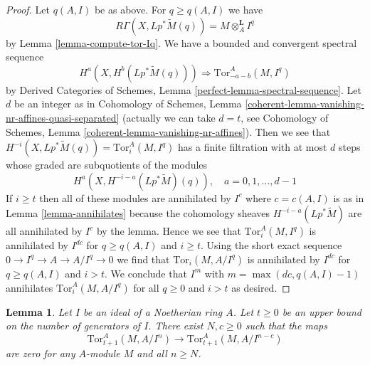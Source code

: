 \documentclass{stacks-project}
\theoremstyle{plain}
\newtheorem{lemma}[subsection]{Lemma}
\theoremstyle{definition}
\theoremstyle{remark}
\numberwithin{equation}{subsection}
\begin{document}
\begin{proof}
Let $q(A, I)$ be as above. For $q \geq q(A, I)$ we have
$$
R\Gamma(X, Lp^*\widetilde{M}(q)) = M \otimes_A^\mathbf{L} I^q
$$
by Lemma \ref{lemma-compute-tor-Iq}.
We have a bounded and convergent spectral sequence
$$
H^a(X, H^b(Lp^*\widetilde{M}(q))) \Rightarrow
\text{Tor}_{-a - b}^A(M, I^q)
$$
by Derived Categories of Schemes, Lemma \ref{perfect-lemma-spectral-sequence}.
Let $d$ be an integer as in Cohomology of Schemes, Lemma
\ref{coherent-lemma-vanishing-nr-affines-quasi-separated}
(actually we can take $d = t$, see
Cohomology of Schemes, Lemma \ref{coherent-lemma-vanishing-nr-affines}).
Then we see that $H^{-i}(X, Lp^*\widetilde{M}(q)) = \text{Tor}_i^A(M, I^q)$
has a finite filtration with at most $d$ steps whose graded are
subquotients of the modules
$$
H^a(X, H^{- i - a}(Lp^*\widetilde{M})(q)),\quad
a = 0, 1, \ldots, d - 1
$$
If $i \geq t$ then all of these modules are annihilated
by $I^c$ where $c = c(A, I)$ is as in Lemma \ref{lemma-annihilates}
because the cohomology sheaves $H^{- i - a}(Lp^*\widetilde{M})$
are all annihilated by $I^c$ by the lemma. Hence we see that
$\text{Tor}_i^A(M, I^q)$ is annihilated by $I^{dc}$ for
$q \geq q(A, I)$ and $i \geq t$. Using the short exact sequence
$0 \to I^q \to A \to A/I^q \to 0$ we find that
$\text{Tor}_i(M, A/I^q)$ is annihilated by $I^{dc}$ for $q \geq q(A, I)$
and $i > t$. We conclude that $I^m$ with $m = \max(dc, q(A, I) - 1)$
annihilates $\text{Tor}_i^A(M, A/I^q)$ for all $q \geq 0$
and $i > t$ as desired.
\end{proof}

\begin{lemma}
\label{lemma-tor-maps-vanish}
Let $I$ be an ideal of a Noetherian ring $A$. Let $t \geq 0$
be an upper bound on the number of generators of $I$.
There exist $N, c \geq 0$ such that the maps
$$
\text{Tor}_{t + 1}^A(M, A/I^n) \to \text{Tor}_{t + 1}^A(M, A/I^{n - c})
$$
are zero for any $A$-module $M$ and all $n \geq N$.
\end{lemma}
\end{document}
